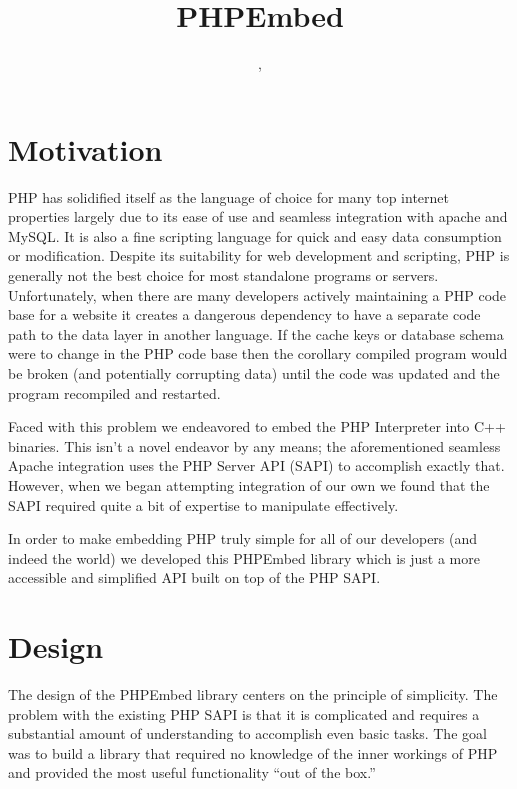\documentclass[11pt,titlepage]{article}
\title{PHPEmbed}
\author{\htmladdnormallink{Andrew Bosworth}{http://www.facebook.com/p/Andrew\_Boz\_Bosworth/1681}, \htmladdnormallink{Facebook, inc}{http://www.facebook.com}}
\begin{document}
\maketitle
\newpage

\tableofcontents
\newpage

\section{Motivation}

PHP has solidified itself as the language of choice for many top internet properties largely due to its ease of use and seamless integration with apache and MySQL. It is also a fine scripting language for quick and easy data consumption or modification. Despite its suitability for web development and scripting, PHP is generally not the best choice for most standalone programs or servers. Unfortunately, when there are many developers actively maintaining a PHP code base for a website it creates a dangerous dependency to have a separate code path to the data layer in another language. If the cache keys or database schema were to change in the PHP code base then the corollary compiled program would be broken (and potentially corrupting data) until the code was updated and the program recompiled and restarted.

Faced with this problem we endeavored to embed the PHP Interpreter into C++ binaries. This isn't a novel endeavor by any means; the aforementioned seamless Apache integration uses the PHP Server API (SAPI) to accomplish exactly that. However, when we began attempting integration of our own we found that the SAPI required quite a bit of expertise to manipulate effectively. 

In order to make embedding PHP truly simple for all of our developers (and indeed the world) we developed this PHPEmbed library which is just a more accessible and simplified API built on top of the PHP SAPI. 

\section{Design}

The design of the PHPEmbed library centers on the principle of simplicity. The problem with the existing PHP SAPI is that it is complicated and requires a substantial amount of understanding to accomplish even basic tasks. The goal was to build a library that required no knowledge of the inner workings of PHP and provided the most useful functionality ``out of the box.''
\end{document}
